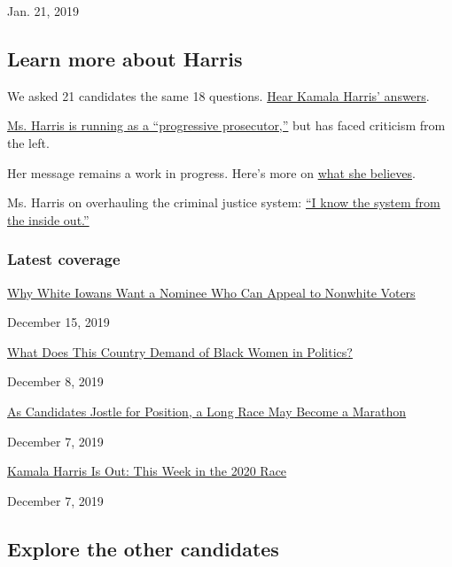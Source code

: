 Jan. 21, 2019

\hypertarget{learn-more-about-harris}{%
\subsection{Learn more about Harris}\label{learn-more-about-harris}}

We asked 21 candidates the same 18 questions.
\href{https://www.nytimes.com/interactive/2019/us/politics/kamala-harris-2020-campaign.html}{Hear
Kamala Harris' answers}.

\href{https://www.nytimes.com/2019/02/11/us/kamala-harris-progressive-prosecutor.html}{Ms.
Harris is running as a ``progressive prosecutor,''} but has faced
criticism from the left.

Her message remains a work in progress. Here's more on
\href{https://www.nytimes.com/2019/07/27/us/politics/kamala-harris-2020-election.html}{what
she believes}.

Ms. Harris on overhauling the criminal justice system:
\href{https://www.nytimes.com/2019/09/09/us/politics/kamala-harris-criminal-justice.html}{``I
know the system from the inside out.''}

\hypertarget{latest-coverage}{%
\subsubsection{Latest coverage}\label{latest-coverage}}

\href{https://www.nytimes.com/2019/12/15/us/politics/iowa-2020-candidates.html}{Why
White Iowans Want a Nominee Who Can Appeal to Nonwhite Voters}

December 15, 2019

\href{https://www.nytimes.com/2019/12/08/us/politics/kamala-harris-black-women.html}{What
Does This Country Demand of Black Women in Politics?}

December 8, 2019

\href{https://www.nytimes.com/2019/12/07/us/politics/democrats-2020.html}{As
Candidates Jostle for Position, a Long Race May Become a Marathon}

December 7, 2019

\href{https://www.nytimes.com/2019/12/07/us/politics/kamala-harris-is-out-this-week-in-the-2020-race.html}{Kamala
Harris Is Out: This Week in the 2020 Race}

December 7, 2019

\hypertarget{explore-the-other-candidates}{%
\subsection{Explore the other
candidates}\label{explore-the-other-candidates}}

